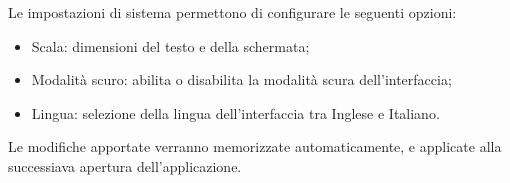 \par Le impostazioni di sistema permettono di configurare le seguenti opzioni:
\begin{itemize}
  \item Scala: dimensioni del testo e della schermata;
  \item Modalità scuro: abilita o disabilita la modalità scura dell'interfaccia;
  \item Lingua: selezione della lingua dell'interfaccia tra Inglese e Italiano.
\end{itemize}
\par Le modifiche apportate verranno memorizzate automaticamente, e applicate alla successiava apertura dell'applicazione.